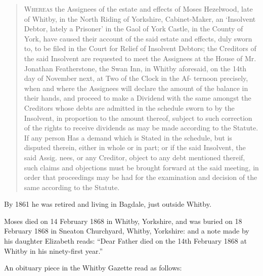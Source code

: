 \begin{quotation}
\textsc{Whereas} the Assignees of the estate and effects of Moses Hezelwood, late of Whitby, in the North Riding of Yorkshire, Cabinet-Maker, an `Insolvent Debtor, lately a Prisoner' in the Gaol of York Castle, in the County of York, have caused their account of the said estate and effects, duly sworn to, to be filed in the Court for Relief of Insolvent Debtors; the Creditors of the said Insolvent are requested to meet the Assignees at the House of Mr. Jonathan Featherstone, the Swan Inn, in Whitby aforesaid, on the 14th day of November next, at Two of the Clock in the Af- ternoon precisely, when and where the Assignees will declare the amount of the balance in their hands, and proceed to make a Dividend with the same amongst the Creditors whose debts are admitted in the schedule sworn to by the Insolvent, in proportion to the amount thereof, subject to such correction of the rights to receive dividends as may be made according to the Statute. If any person Has a demand which is Stated in the schedule, but is disputed therein, either in whole or in part; or if the said Insolvent, the said Assig. nees, or any Creditor, object to any debt mentioned thereif, such claims and objections must be brought forward at the said meeting, in order that proceedings may be had for the examination and decision of the same according to the Statute.
\end{quotation}

By 1861 he was retired and living in Bagdale, just outside Whitby. \cite{MHezelwood1861}

Moses died on 14 February 1868 in Whitby, Yorkshire, and was buried on 18 February 1868 in Sneaton Churchyard,	Whitby, Yorkshire: \cite{MHezelwoodDeath} and a note made by his daughter Elizabeth reads: ``Dear Father died on the 14th February 1868 at Whitby in his ninety-first year.''

An obituary piece in the Whitby Gazette read as follows:\cite{MHezelwoodDeathnotice}

